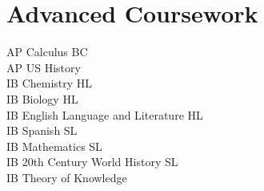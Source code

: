 \documentclass[12pt]{article}
\begin{document}
\section*{Advanced Coursework}
AP Calculus BC \\
AP US History \\
IB Chemistry HL \\
IB Biology HL \\
IB English Language and Literature HL \\
IB Spanish SL \\
IB Mathematics SL \\
IB 20th Century World History SL \\
IB Theory of Knowledge



\end{document}
